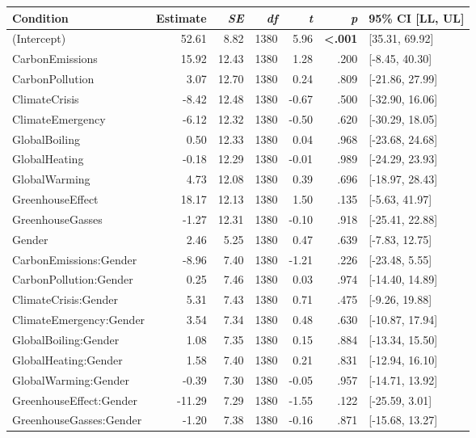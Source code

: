 \begin{table}[ht]
\centering
\begin{tabular}{lrrrrrl}
  \hline
Condition & Estimate & \textit{SE} & \textit{df} & \textit{t} & \textit{p} & 95\% CI [LL, UL] \\ 
  \hline
(Intercept) & 52.61 & 8.82 & 1380 & 5.96 & \textbf{\textless  .001} & [35.31, 69.92] \\ 
  CarbonEmissions & 15.92 & 12.43 & 1380 & 1.28 & .200 & [-8.45, 40.30] \\ 
  CarbonPollution & 3.07 & 12.70 & 1380 & 0.24 & .809 & [-21.86, 27.99] \\ 
  ClimateCrisis & -8.42 & 12.48 & 1380 & -0.67 & .500 & [-32.90, 16.06] \\ 
  ClimateEmergency & -6.12 & 12.32 & 1380 & -0.50 & .620 & [-30.29, 18.05] \\ 
  GlobalBoiling & 0.50 & 12.33 & 1380 & 0.04 & .968 & [-23.68, 24.68] \\ 
  GlobalHeating & -0.18 & 12.29 & 1380 & -0.01 & .989 & [-24.29, 23.93] \\ 
  GlobalWarming & 4.73 & 12.08 & 1380 & 0.39 & .696 & [-18.97, 28.43] \\ 
  GreenhouseEffect & 18.17 & 12.13 & 1380 & 1.50 & .135 & [-5.63, 41.97] \\ 
  GreenhouseGasses & -1.27 & 12.31 & 1380 & -0.10 & .918 & [-25.41, 22.88] \\ 
  Gender & 2.46 & 5.25 & 1380 & 0.47 & .639 & [-7.83, 12.75] \\ 
  CarbonEmissions:Gender & -8.96 & 7.40 & 1380 & -1.21 & .226 & [-23.48, 5.55] \\ 
  CarbonPollution:Gender & 0.25 & 7.46 & 1380 & 0.03 & .974 & [-14.40, 14.89] \\ 
  ClimateCrisis:Gender & 5.31 & 7.43 & 1380 & 0.71 & .475 & [-9.26, 19.88] \\ 
  ClimateEmergency:Gender & 3.54 & 7.34 & 1380 & 0.48 & .630 & [-10.87, 17.94] \\ 
  GlobalBoiling:Gender & 1.08 & 7.35 & 1380 & 0.15 & .884 & [-13.34, 15.50] \\ 
  GlobalHeating:Gender & 1.58 & 7.40 & 1380 & 0.21 & .831 & [-12.94, 16.10] \\ 
  GlobalWarming:Gender & -0.39 & 7.30 & 1380 & -0.05 & .957 & [-14.71, 13.92] \\ 
  GreenhouseEffect:Gender & -11.29 & 7.29 & 1380 & -1.55 & .122 & [-25.59, 3.01] \\ 
  GreenhouseGasses:Gender & -1.20 & 7.38 & 1380 & -0.16 & .871 & [-15.68, 13.27] \\ 
   \hline
\end{tabular}
\end{table}
